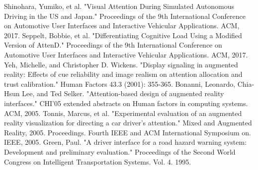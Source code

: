 \documentclass[a4paper, 11pt]{article}
\begin{document}
\begin{thebibliography}{9}
 Shinohara, Yumiko, et al. "Visual Attention During Simulated Autonomous Driving in the US and Japan." Proceedings of the 9th International Conference on Automotive User Interfaces and Interactive Vehicular Applications. ACM, 2017.
 Seppelt, Bobbie, et al. "Differentiating Cognitive Load Using a Modified Version of AttenD." Proceedings of the 9th International Conference on Automotive User Interfaces and Interactive Vehicular Applications. ACM, 2017.
 Yeh, Michelle, and Christopher D. Wickens. "Display signaling in augmented reality: Effects of cue reliability and image realism on attention allocation and trust calibration." Human Factors 43.3 (2001): 355-365.
 Bonanni, Leonardo, Chia-Hsun Lee, and Ted Selker. "Attention-based design of augmented reality interfaces." CHI'05 extended abstracts on Human factors in computing systems. ACM, 2005.
 Tonnis, Marcus, et al. "Experimental evaluation of an augmented reality visualization for directing a car driver's attention." Mixed and Augmented Reality, 2005. Proceedings. Fourth IEEE and ACM International Symposium on. IEEE, 2005.
 Green, Paul. "A driver interface for a road hazard warning system: Development and preliminary evaluation." Proceedings of the Second World Congress on Intelligent Transportation Systems. Vol. 4. 1995.
\end{thebibliography}
\end{document}
